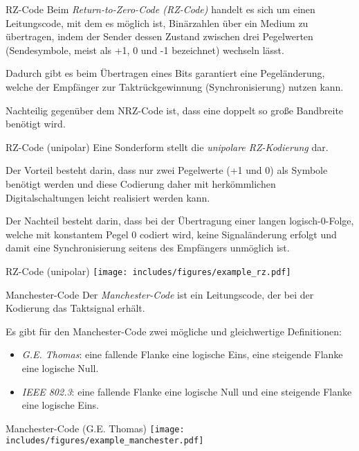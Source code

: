\begin{defi}{RZ-Code}
    Beim \emph{Return-to-Zero-Code (RZ-Code)} handelt es sich um einen Leitungscode, mit dem es möglich ist, Binärzahlen über ein Medium zu übertragen, indem der Sender dessen Zustand zwischen drei Pegelwerten (Sendesymbole, meist als +1, 0 und -1 bezeichnet) wechseln lässt.

    Dadurch gibt es beim Übertragen eines Bits garantiert eine Pegeländerung, welche der Empfänger zur Taktrückgewinnung (Synchronisierung) nutzen kann.

    Nachteilig gegenüber dem NRZ-Code ist, dass eine doppelt so große Bandbreite benötigt wird.
\end{defi}

\begin{bonus}{RZ-Code (unipolar)}
    Eine Sonderform stellt die \emph{unipolare RZ-Kodierung} dar.

    Der Vorteil besteht darin, dass nur zwei Pegelwerte (+1 und 0) als Symbole benötigt werden und diese Codierung daher mit herkömmlichen Digitalschaltungen leicht realisiert werden kann.

    Der Nachteil besteht darin, dass bei der Übertragung einer langen logisch-0-Folge, welche mit konstantem Pegel 0 codiert wird, keine Signaländerung erfolgt und damit eine Synchronisierung seitens des Empfängers unmöglich ist.
\end{bonus}

\begin{example}{RZ-Code (unipolar)}
    \centering
    \texttt{[image: includes/figures/example\_rz.pdf]}
\end{example}

\begin{defi}{Manchester-Code}
    Der \emph{Manchester-Code} ist ein Leitungscode, der bei der Kodierung das Taktsignal erhält.

    Es gibt für den Manchester-Code zwei mögliche und gleichwertige Definitionen:
    \begin{itemize}
        \item \emph{G.E. Thomas}: eine fallende Flanke eine logische Eins, eine steigende Flanke eine logische Null.
        \item \emph{IEEE 802.3}: eine fallende Flanke eine logische Null und eine steigende Flanke eine logische Eins.
    \end{itemize}
\end{defi}

\begin{example}{Manchester-Code (G.E. Thomas)}
    \centering
    \texttt{[image: includes/figures/example\_manchester.pdf]}
\end{example}

